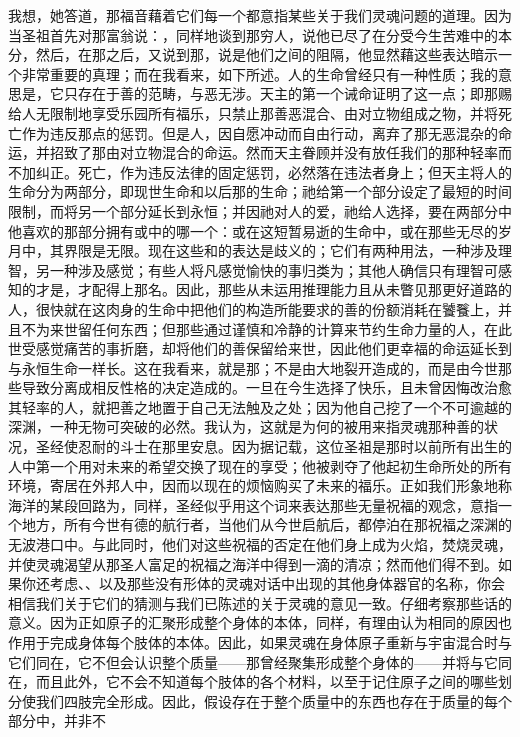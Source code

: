 我想，她答道，那福音藉着它们每一个都意指某些关于我们灵魂问题的道理。因为当圣祖首先对那富翁说：，同样地谈到那穷人，说他已尽了在分受今生苦难中的本分，然后，在那之后，又说到那，说是他们之间的阻隔，他显然藉这些表达暗示一个非常重要的真理；而在我看来，如下所述。人的生命曾经只有一种性质；我的意思是，它只存在于善的范畴，与恶无涉。天主的第一个诫命证明了这一点；即那赐给人无限制地享受乐园所有福乐，只禁止那善恶混合、由对立物组成之物，并将死亡作为违反那点的惩罚。但是人，因自愿冲动而自由行动，离弃了那无恶混杂的命运，并招致了那由对立物混合的命运。然而天主眷顾并没有放任我们的那种轻率而不加纠正。死亡，作为违反法律的固定惩罚，必然落在违法者身上；但天主将人的生命分为两部分，即现世生命和以后那的生命；祂给第一个部分设定了最短的时间限制，而将另一个部分延长到永恒；并因祂对人的爱，祂给人选择，要在两部分中他喜欢的那部分拥有或中的哪一个：或在这短暂易逝的生命中，或在那些无尽的岁月中，其界限是无限。现在这些和的表达是歧义的；它们有两种用法，一种涉及理智，另一种涉及感觉；有些人将凡感觉愉快的事归类为；其他人确信只有理智可感知的才是，才配得上那名。因此，那些从未运用推理能力且从未瞥见那更好道路的人，很快就在这肉身的生命中把他们的构造所能要求的善的份额消耗在饕餮上，并且不为来世留任何东西；但那些通过谨慎和冷静的计算来节约生命力量的人，在此世受感觉痛苦的事折磨，却将他们的善保留给来世，因此他们更幸福的命运延长到与永恒生命一样长。这在我看来，就是那；不是由大地裂开造成的，而是由今世那些导致分离成相反性格的决定造成的。一旦在今生选择了快乐，且未曾因悔改治愈其轻率的人，就把善之地置于自己无法触及之处；因为他自己挖了一个不可逾越的深渊，一种无物可突破的必然。我认为，这就是为何的被用来指灵魂那种善的状况，圣经使忍耐的斗士在那里安息。因为据记载，这位圣祖是那时以前所有出生的人中第一个用对未来的希望交换了现在的享受；他被剥夺了他起初生命所处的所有环境，寄居在外邦人中，因而以现在的烦恼购买了未来的福乐。正如我们形象地称海洋的某段回路为，同样，圣经似乎用这个词来表达那些无量祝福的观念，意指一个地方，所有今世有德的航行者，当他们从今世启航后，都停泊在那祝福之深渊的无波港口中。与此同时，他们对这些祝福的否定在他们身上成为火焰，焚烧灵魂，并使灵魂渴望从那圣人富足的祝福之海洋中得到一滴的清凉；然而他们得不到。如果你还考虑、、以及那些没有形体的灵魂对话中出现的其他身体器官的名称，你会相信我们关于它们的猜测与我们已陈述的关于灵魂的意见一致。仔细考察那些话的意义。因为正如原子的汇聚形成整个身体的本体，同样，有理由认为相同的原因也作用于完成身体每个肢体的本体。因此，如果灵魂在身体原子重新与宇宙混合时与它们同在，它不但会认识整个质量——那曾经聚集形成整个身体的——并将与它同在，而且此外，它不会不知道每个肢体的各个材料，以至于记住原子之间的哪些划分使我们四肢完全形成。因此，假设存在于整个质量中的东西也存在于质量的每个部分中，并非不
